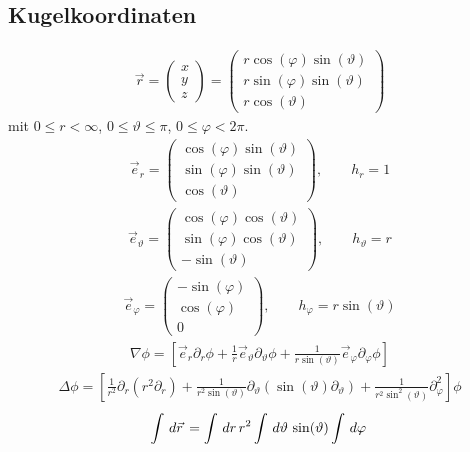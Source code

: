\subsection{Kugelkoordinaten}
\begin{align*}
\vec{r} = \begin{pmatrix}x \\ y \\ z\end{pmatrix} =
\begin{pmatrix}r\cos(\varphi)\sin(\vartheta) \\ r\sin(\varphi)\sin(\vartheta) \\
r\cos(\vartheta)\end{pmatrix}
\end{align*}
mit $0 \le r < \infty$, $0 \le \vartheta \le \pi$, $0 \le \varphi < 2\pi$.
\begin{align*}
\vec{e}_r = \begin{pmatrix}\cos(\varphi)\sin(\vartheta) \\
\sin(\varphi)\sin(\vartheta) \\ \cos(\vartheta)\end{pmatrix},\qquad h_r = 1
\end{align*}
\begin{align*}
\vec{e}_\vartheta = \begin{pmatrix}\cos(\varphi)\cos(\vartheta) \\
\sin(\varphi)\cos(\vartheta) \\ -\sin(\vartheta)\end{pmatrix},\qquad h_\vartheta
= r
\end{align*}
\begin{align*}
 \vec{e}_\varphi = \begin{pmatrix}-\sin(\varphi) \\ \cos(\varphi) \\
 0\end{pmatrix},\qquad h_\varphi = r\sin(\vartheta)
\end{align*}
\begin{align*}
\nabla\phi = \left[ \vec{e}_r\partial_r\phi +
\frac{1}{r}\vec{e}_\vartheta\partial_\vartheta\phi +
\frac{1}{r\sin(\vartheta)}\vec{e}_\varphi\partial_\varphi\phi \right]
\end{align*}
\begin{align*}
\Delta\phi = \left[ \frac{1}{r^2}\partial_r(r^2\partial_r) +
\frac{1}{r^2\sin(\vartheta)}\partial_\vartheta
(\sin(\vartheta)\partial_\vartheta) +
\frac{1}{r^2\sin^2(\vartheta)}\partial^2_\varphi \right]\phi
\end{align*}
\begin{align*}
\int \,d\vec{r}\, = \int \,dr\, r^2 \int \,d\vartheta\, \sin(\vartheta) \int \,d\varphi\,
\end{align*}